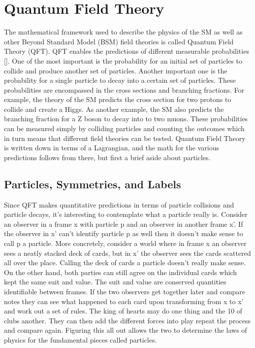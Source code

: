 \section{Quantum Field Theory}

The mathematical framework used to describe the physics of the SM as well as other Beyond Standard Model (BSM) field theories is called Quantum Field Theory (QFT). QFT enables the predictions of different measurable probabilities [\cite{peskin}]. One of the most important is the probability for an initial set of particles to collide and produce another set of particles. Another important one is the probability for a single particle to decay into a certain set of particles. These probabilities are encompassed in the cross sections and branching fractions. For example, the theory of the SM predicts the cross section for two protons to collide and create a Higgs. As another example, the SM also predicts the branching fraction for a Z boson to decay into to two muons. These probabilities can be measured simply by colliding particles and counting the outcomes which in turn means that different field theories can be tested. Quantum Field Theory is written down in terms of a Lagrangian, and the math for the various predictions follows from there, but first a brief aside about particles. 

\subsection{Particles, Symmetries, and Labels}

Since QFT makes quantitative predictions in terms of particle collisions and particle decays, it's interesting to contemplate what a particle really is. Consider an observer in a frame x with particle p and an observer in another frame x'. If the observer in x' can't identify particle p as well then it doesn't make sense to call p a particle. More concretely, consider a world where in frame x an observer sees a neatly stacked deck of cards, but in x' the observer sees the cards scattered all over the place. Calling the deck of cards a particle doesn't really make sense. On the other hand, both parties can still agree on the individual cards which kept the same suit and value. The suit and value are conserved quantities identifiable between frames. If the two observers get together later and compare notes they can see what happened to each card upon transforming from x to x' and work out a set of rules. The king of hearts may do one thing and the 10 of clubs another. They can then add the different forces into play repeat the process and compare again. Figuring this all out allows the two to determine the laws of physics for the fundamental pieces called particles.       

